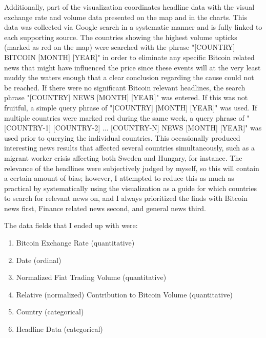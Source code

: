 \documentclass[journal]{vgtc}                %
\begin{document}
Additionally, part of the visualization coordinates headline data with the visual exchange rate and volume data presented on the map and in the charts.  This data was collected via Google search in a systematic manner and is fully linked to each supporting source.  The countries showing the highest volume upticks (marked as red on the map) were searched with the phrase "[COUNTRY] BITCOIN [MONTH] [YEAR]" in order to eliminate any specific Bitcoin related news that might have influenced the price since these events will at the very least muddy the waters enough that a clear conclusion regarding the cause could not be reached.  If there were no significant Bitcoin relevant headlines, the search phrase "[COUNTRY] NEWS [MONTH] [YEAR]" was entered.  If this was not fruitful, a simple query phrase of "[COUNTRY] [MONTH] [YEAR]" was used.  If multiple countries were marked red during the same week, a query phrase of "[COUNTRY-1] [COUNTRY-2] ... [COUNTRY-N] NEWS [MONTH] [YEAR]" was used prior to querying the individual countries.  This occasionally produced interesting news results that affected several countries simultaneously, such as a migrant worker crisis affecting both Sweden and Hungary, for instance.  The relevance of the headlines were subjectively judged by myself, so this will contain a certain amount of bias; however, I attempted to reduce this as much as practical by systematically using the visualization as a guide for which countries to search for relevant news on, and I always prioritized the finds with Bitcoin news first, Finance related news second, and general news third.

The data fields that I ended up with were:
\begin{enumerate}
	\item Bitcoin Exchange Rate (quantitative)
	\item Date (ordinal)
	\item Normalized Fiat Trading Volume (quantitative)
	\item Relative (normalized) Contribution to Bitcoin Volume (quantitative)
	\item Country (categorical)
	\item Headline Data (categorical)
\end{enumerate}
\end{document}
